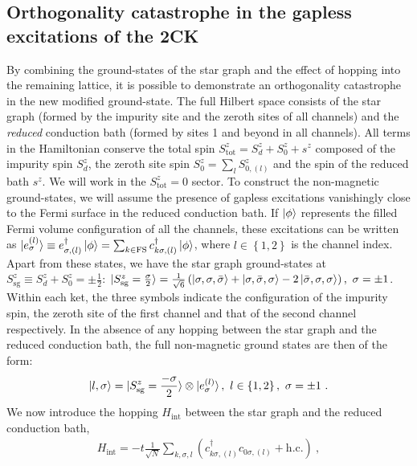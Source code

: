 \documentclass[12pt]{iopart}
\begin{document}
\subsection{Orthogonality catastrophe in the gapless excitations of the 2CK}
By combining the ground-states of the star graph and the effect of hopping into the remaining lattice, it is possible to demonstrate an orthogonality catastrophe~\cite{anderson1967infrared,varma2002singular} in the new modified ground-state. The full Hilbert space consists of the star graph (formed by the impurity site and the zeroth sites of all channels) and the {\it reduced} conduction bath (formed by sites 1 and beyond in all channels). All terms in the Hamiltonian conserve the total spin \(S_\text{tot}^z = S_d^z + S_0^z + s^z\) composed of the impurity spin \(S_d^z\), the zeroth site spin \(S_0^z = \sum_l S_{0,(l)}^z\) and the spin of the reduced bath \(s^z\). We will work in the \(S_\text{tot}^z = 0\) sector. To construct the non-magnetic ground-states, we will assume the presence of gapless excitations vanishingly close to the Fermi surface in the reduced conduction bath. If \(\ket{\phi}\) represents the filled Fermi volume configuration of all the channels, these excitations can be written as \(\ket{e_\sigma^{(l)}} \equiv e^\dagger_{\sigma,(l)} \ket{\phi} = \sum_{k \in \text{FS}}c^\dagger_{k\sigma,(l)} \ket{\phi}\), where \(l \in \left\{1,2\right\} \) is the channel index. Apart from these states, we have the star graph ground-states at \(S_\text{sg}^z \equiv S_d^z + S_0^z = \pm \frac{1}{2}\): \(\ket{S_\text{sg}^z = \frac{\sigma}{2}} = \frac{1}{\sqrt 6}\left( \ket{\sigma,\sigma,\bar\sigma} + \ket{\sigma,\bar\sigma,\sigma} -2\ket{\bar\sigma,\sigma,\sigma} \right),~ \sigma=\pm 1 \). Within each ket, the three symbols indicate the configuration of the impurity spin, the zeroth site of the first channel and that of the second channel respectively. In the absence of any hopping between the star graph and the reduced conduction bath, the full non-magnetic ground states are then of the form:
\begin{equation}\begin{aligned}
	\ket{l,\sigma} = \ket{S^z_\text{sg}=\frac{-\sigma}{2}}\otimes\ket{e_{\sigma}^{(l)}},~l\in\left\{ 1,2 \right\},~\sigma=\pm 1~.
\end{aligned}\end{equation}
We now introduce the hopping \(H_\text{int}\) between the star graph and the reduced conduction bath,
\begin{equation}\begin{aligned}
	H_\text{int} = -t\frac{1}{\sqrt N}\sum_{k,\sigma,l}\left( c^\dagger_{k\sigma,(l)}c_{0\sigma,(l)} + \text{h.c.} \right)~,
\end{aligned}\end{equation}
\end{document}
